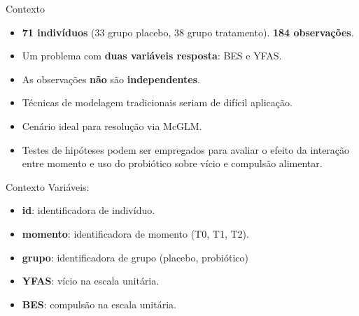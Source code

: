 \documentclass[
  ignorenonframetext,
  serif,
  professionalfont,
  usenames,
  dvipsnames,
  aspectratio = 169]{beamer}
\begin{document}
\begin{frame}{Contexto}
\protect\hypertarget{contexto-2}{}
\begin{itemize}
  \itemsep 2ex
  
  \item \textbf{71 indivíduos} (33 grupo placebo, 38 grupo tratamento). \textbf{184 observações}. 

  \item Um problema com \textbf{duas variáveis resposta}: BES e YFAS.

  \item As observações \textbf{não} são \textbf{independentes}.

  \item Técnicas de modelagem tradicionais seriam de difícil aplicação. 

  \item Cenário ideal para resolução via McGLM.

  \item Testes de hipóteses podem ser empregados para avaliar o efeito da interação entre momento e uso do probiótico sobre vício e compulsão alimentar.

\end{itemize}
\end{frame}

\begin{frame}{Contexto}
\protect\hypertarget{contexto-3}{}
Variáveis:

\begin{itemize}
  \item \textbf{id}: identificadora de indivíduo.
  \item \textbf{momento}: identificadora de momento (T0, T1, T2).
  \item \textbf{grupo}: identificadora de grupo (placebo, probiótico)
  \item \textbf{YFAS}: vício na escala unitária.
  \item \textbf{BES}: compulsão na escala unitária.
\end{itemize}
\end{frame}
\end{document}
